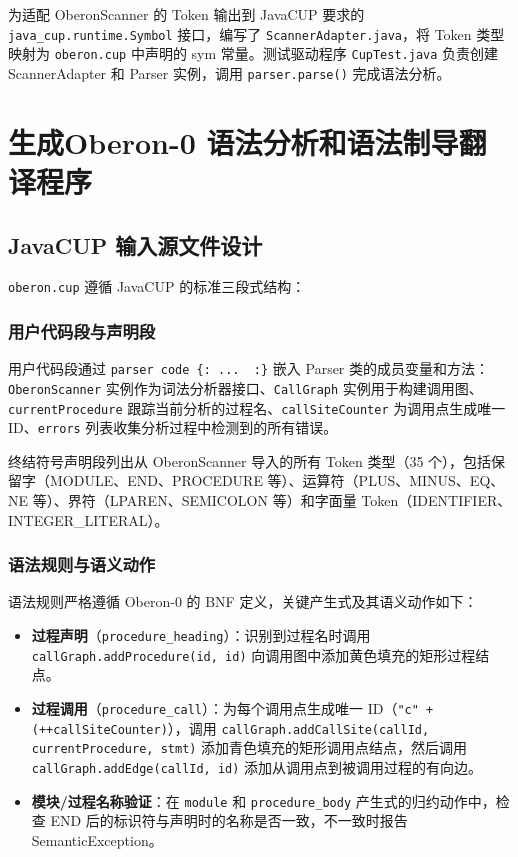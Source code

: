 为适配 OberonScanner 的 Token 输出到 JavaCUP 要求的 \texttt{java\_cup.runtime.Symbol} 接口，编写了 \texttt{ScannerAdapter.java}，将 Token 类型映射为 \texttt{oberon.cup} 中声明的 sym 常量。测试驱动程序 \texttt{CupTest.java} 负责创建 ScannerAdapter 和 Parser 实例，调用 \texttt{parser.parse()} 完成语法分析。

\section{生成Oberon-0 语法分析和语法制导翻译程序}

\subsection{JavaCUP 输入源文件设计}

\texttt{oberon.cup} 遵循 JavaCUP 的标准三段式结构：

\subsubsection{用户代码段与声明段}

用户代码段通过 \texttt{parser code \{:\ ... \ :\}} 嵌入 Parser 类的成员变量和方法：\texttt{OberonScanner} 实例作为词法分析器接口、\texttt{CallGraph} 实例用于构建调用图、\texttt{currentProcedure} 跟踪当前分析的过程名、\texttt{callSiteCounter} 为调用点生成唯一 ID、\texttt{errors} 列表收集分析过程中检测到的所有错误。

终结符号声明段列出从 OberonScanner 导入的所有 Token 类型（35 个），包括保留字（MODULE、END、PROCEDURE 等）、运算符（PLUS、MINUS、EQ、NE 等）、界符（LPAREN、SEMICOLON 等）和字面量 Token（IDENTIFIER、INTEGER\_LITERAL）。

\subsubsection{语法规则与语义动作}

语法规则严格遵循 Oberon-0 的 BNF 定义，关键产生式及其语义动作如下：

\begin{itemize}
    \item \textbf{过程声明}（\texttt{procedure\_heading}）：识别到过程名时调用 \texttt{callGraph.addProcedure(id, id)} 向调用图中添加黄色填充的矩形过程结点。
    \item \textbf{过程调用}（\texttt{procedure\_call}）：为每个调用点生成唯一 ID（\texttt{"c" + (++callSiteCounter)}），调用 \texttt{callGraph.addCallSite(callId, currentProcedure, stmt)} 添加青色填充的矩形调用点结点，然后调用 \texttt{callGraph.addEdge(callId, id)} 添加从调用点到被调用过程的有向边。
    \item \textbf{模块/过程名称验证}：在 \texttt{module} 和 \texttt{procedure\_body} 产生式的归约动作中，检查 END 后的标识符与声明时的名称是否一致，不一致时报告 SemanticException。
\end{itemize}


